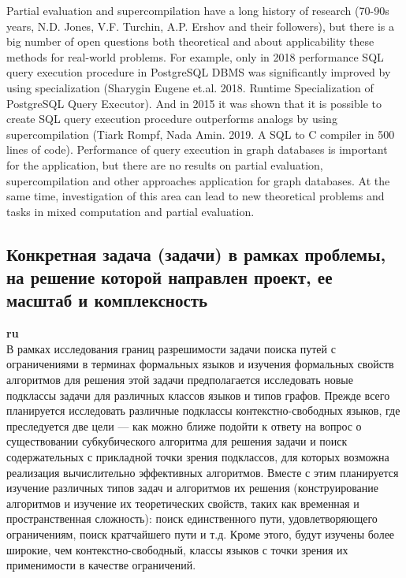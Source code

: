 \documentclass[12pt]{article}  %
\theoremstyle{remark}
\begin{document}
Partial evaluation and supercompilation have a long history of research (70-90s years, N.D. Jones, V.F. Turchin, A.P. Ershov and their followers), but there is a big number of open questions both theoretical and about applicability these methods for real-world problems. For example, only in 2018 performance SQL query execution procedure in PostgreSQL DBMS was significantly improved by using specialization (Sharygin Eugene et.al. 2018. Runtime Specialization of PostgreSQL Query Executor). And in 2015 it was shown that it is possible to create SQL query execution procedure outperforms analogs by using supercompilation (Tiark Rompf, Nada Amin. 2019. A SQL to C compiler in 500 lines of code). Performance of query execution in graph databases is important for the application, but there are no results on partial evaluation, supercompilation and other approaches application for graph databases. At the same time, investigation of this area can lead to new theoretical problems and tasks in mixed computation and partial evaluation.

\subsection{Конкретная задача (задачи) в рамках проблемы, на решение которой направлен проект, ее масштаб и комплексность}

\textbf{ru}\\
%
В рамках исследования границ разрешимости задачи поиска путей с ограничениями в терминах формальных языков и изучения формальных свойств алгоритмов для решения этой задачи предполагается исследовать новые подклассы задачи для различных классов языков и типов графов. Прежде всего планируется исследовать различные подклассы контекстно-свободных языков, где преследуется две цели --- как можно ближе подойти к ответу на вопрос о существовании субкубического алгоритма для решения задачи и поиск содержательных с прикладной точки зрения подклассов, для которых возможна реализация вычислительно эффективных алгоритмов. Вместе с этим планируется изучение различных типов задач и алгоритмов их решения (конструирование алгоритмов и изучение их теоретических свойств, таких как временная и пространственная сложность): поиск единственного пути, удовлетворяющего ограничениям, поиск кратчайшего пути и т.д. Кроме этого, будут изучены более широкие, чем контекстно-свободный, классы языков с точки зрения их применимости в качестве ограничений.
\end{document}
